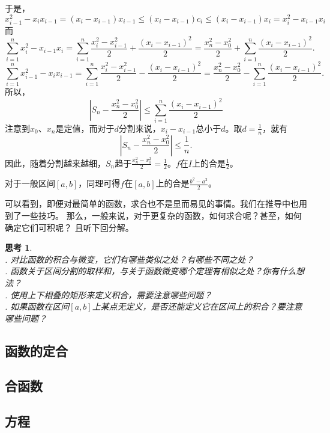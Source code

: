 \documentclass[12pt,UTF8]{ctexbook}
\newtheorem{sk}{思考}[section]
\begin{document}
于是，
$$ x_{i-1}^2 - x_i x_{i-1} = (x_i - x_{i-1}) x_{i-1} \leqslant (x_i - x_{i-1}) c_i \leqslant (x_i - x_{i-1}) x_i = x_i^2 - x_{i-1} x_i $$
而
$$ \sum_{i=1}^n x_i^2 - x_{i-1} x_i = \sum_{i=1}^n \frac{x_i^2 - x_{i-1}^2}{2} + \frac{(x_i - x_{i-1})^2}{2} = \frac{x_n^2 - x_0^2}{2} + \sum_{i=1}^n\frac{(x_i - x_{i-1})^2}{2}. $$
$$ \sum_{i=1}^n x_{i-1}^2 - x_i x_{i-1} = \sum_{i=1}^n \frac{x_i^2 - x_{i-1}^2}{2} - \frac{(x_i - x_{i-1})^2}{2} = \frac{x_n^2 - x_0^2}{2} - \sum_{i=1}^n\frac{(x_i - x_{i-1})^2}{2}. $$
所以，
$$ \left| S_n - \frac{x_n^2 - x_0^2}{2} \right| \leqslant \sum_{i=1}^n\frac{(x_i - x_{i-1})^2}{2} $$
注意到$x_0$、$x_n$是定值，而对于$d$分割来说，$x_i - x_{i-1}$总小于$d$。取$d = \frac{1}{n}$，就有
$$ \left| S_n - \frac{x_n^2 - x_0^2}{2} \right| \leqslant \frac{1}{n}. $$
因此，随着分割越来越细，$S_n$趋于$\frac{x_n^2 - x_0^2}{2} = \frac{1}{2}$。$f$在$I$上的合是$\frac{1}{2}$。

对于一般区间$[a, b]$，同理可得$f$在$[a, b]$上的合是$\frac{b^2 - a^2}{2}$。

可以看到，即便对最简单的函数，求合也不是显而易见的事情。我们在推导中也用到了一些技巧。
那么，一般来说，对于更复杂的函数，如何求合呢？甚至，如何确定它们可积呢？
且听下回分解。

\begin{sk}
    \mbox{} \\
    . 对比函数的积合与微变，它们有哪些类似之处？有哪些不同之处？\\
    . 函数关于区间分割的取样和，与关于函数微变哪个定理有相似之处？你有什么想法？\\
    . 使用上下相叠的矩形来定义积合，需要注意哪些问题？\\
    . 如果函数在区间$[a, b]$上某点无定义，是否还能定义它在区间上的积合？要注意哪些问题？
\end{sk}

\section{函数的定合}
\section{合函数}


\begin{appendix}

\chapter{方程}

\end{appendix}
\end{document}
